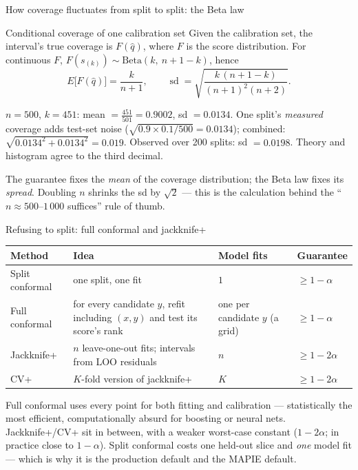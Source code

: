\documentclass[aspectratio=169,11pt]{beamer}
\begin{document}
\begin{frame}{How coverage fluctuates from split to split: the Beta law}
  \footnotesize
  \begin{block}{Conditional coverage of one calibration set}
    Given the calibration set, the interval's true coverage is
    $F(\hat q)$, where $F$ is the score distribution. For continuous $F$,
    $F(s_{(k)}) \sim \text{Beta}(k,\ n + 1 - k)$, hence
    \[
      E\big[F(\hat q)\big] = \frac{k}{n+1}, \qquad
      \operatorname{sd} = \sqrt{\frac{k\,(n+1-k)}{(n+1)^2 (n+2)}}.
    \]
  \end{block}
  \begin{numexample}
    $n = 500$, $k = 451$: mean $= \tfrac{451}{501} = 0.9002$, sd $= 0.0134$. One
    split's \emph{measured} coverage adds test-set noise
    ($\sqrt{0.9 \times 0.1 / 500} = 0.0134$); combined:
    $\sqrt{0.0134^2 + 0.0134^2} = 0.019$. Observed over 200 splits: sd $= 0.0198$.
    Theory and histogram agree to the third decimal.
  \end{numexample}
  \begin{takeaway}
    The guarantee fixes the \emph{mean} of the coverage distribution; the Beta law
    fixes its \emph{spread}. Doubling $n$ shrinks the sd by $\sqrt{2}$ --- this is the
    calculation behind the ``$n \approx 500$--$1\,000$ suffices'' rule of thumb.
  \end{takeaway}
\end{frame}

\begin{frame}{Refusing to split: full conformal and jackknife+}
  \footnotesize
  \begin{center}
  \begin{tabular}{@{}p{2.6cm}p{4.6cm}p{2.6cm}p{2.6cm}@{}}
    \toprule
    \textbf{Method} & \textbf{Idea} & \textbf{Model fits} & \textbf{Guarantee} \\
    \midrule
    Split conformal & one split, one fit & $1$ & $\ge 1 - \alpha$ \\
    Full conformal & for every candidate $y$, refit including $(x, y)$ and test its
      score's rank & one per candidate $y$ (a grid) & $\ge 1 - \alpha$ \\
    Jackknife+ & $n$ leave-one-out fits; intervals from LOO residuals &
      $n$ & $\ge 1 - 2\alpha$ \\
    CV+ & $K$-fold version of jackknife+ & $K$ & $\ge 1 - 2\alpha$ \\
    \bottomrule
  \end{tabular}
  \end{center}
  \begin{readme}
    Full conformal uses every point for both fitting and calibration --- statistically
    the most efficient, computationally absurd for boosting or neural nets.
    Jackknife+/CV+ sit in between, with a weaker worst-case constant ($1 - 2\alpha$;
    in practice close to $1 - \alpha$). Split conformal costs one held-out slice and
    \emph{one} model fit --- which is why it is the production default and the MAPIE
    default.
  \end{readme}
\end{frame}
\end{document}
